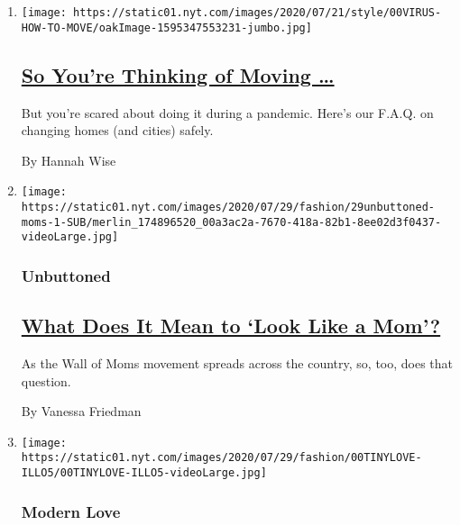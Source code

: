 \begin{enumerate}
\def\labelenumi{\arabic{enumi}.}
\item
  \texttt{[image: https://static01.nyt.com/images/2020/07/21/style/00VIRUS-HOW-TO-MOVE/oakImage-1595347553231-jumbo.jpg]}

  \hypertarget{so-youre-thinking-of-moving-}{%
  \subsection{\texorpdfstring{\href{/2020/07/24/style/moving-during-covid-coronavirus.html}{So
  You're Thinking of Moving
  \ldots{}}}{So You're Thinking of Moving \ldots{}}}\label{so-youre-thinking-of-moving-}}

  But you're scared about doing it during a pandemic. Here's our F.A.Q.
  on changing homes (and cities) safely.

  By Hannah Wise
\item
  \texttt{[image: https://static01.nyt.com/images/2020/07/29/fashion/29unbuttoned-moms-1-SUB/merlin\_174896520\_00a3ac2a-7670-418a-82b1-8ee02d3f0437-videoLarge.jpg]}

  \hypertarget{unbuttoned}{%
  \subsubsection{Unbuttoned}\label{unbuttoned}}

  \hypertarget{what-does-it-mean-to-look-like-a-mom}{%
  \subsection{\texorpdfstring{\href{/2020/07/28/style/wall-of-moms-image.html}{What
  Does It Mean to `Look Like a
  Mom'?}}{What Does It Mean to `Look Like a Mom'?}}\label{what-does-it-mean-to-look-like-a-mom}}

  As the Wall of Moms movement spreads across the country, so, too, does
  that question.

  By Vanessa Friedman
\item
  \texttt{[image: https://static01.nyt.com/images/2020/07/29/fashion/00TINYLOVE-ILLO5/00TINYLOVE-ILLO5-videoLarge.jpg]}

  \hypertarget{modern-love}{%
  \subsubsection{Modern Love}\label{modern-love}}

  \hypertarget{tiny-love-stories-my-parents-never-called}{%
}
\end{enumerate}

